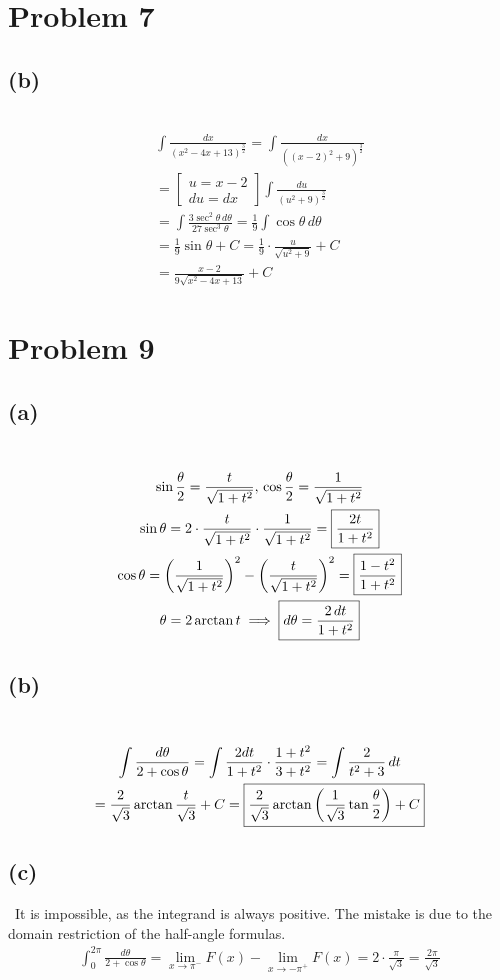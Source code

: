 \documentclass[12pt]{article}
\newcommand*{\paren}[1]{\ensuremath\left(#1\right)}
\newcommand{\problem}[1]{\section{Problem #1}}
\newcommand{\subproblem}[1]{\subsection{(#1)} \,}
\begin{document}
\problem{7}

\subproblem{b}
\begin{gather*}
    \int \frac{dx}{(x^2-4x+13)^\frac{3}{2}}
    = \int \frac{dx}{((x-2)^2+9)^\frac{3}{2}}\\
    =\begin{bmatrix}
        u=x-2\\
        du=dx
    \end{bmatrix}
    \int \frac{du}{(u^2+9)^\frac{3}{2}}\\
    = \int \frac{3\sec^2 \theta\, d\theta }{27\sec^3 \theta }
    = \frac{1}{9} \int \cos \theta \, d\theta \\
    =\frac{1}{9} \sin \theta + C = \frac{1}{9} \cdot \frac{u}{\sqrt{u^2+9}}+C\\
    =\boxed{ \frac{x-2}{9\sqrt{x^2-4x+13}} + C}
\end{gather*}

\problem{9}

\subproblem{a}
\begin{gather*}
    \sin \frac{\theta}{2}=\frac{t}{\sqrt{1+t^2}},\, \cos \frac{\theta}{2}= \frac{1}{\sqrt{1+t^2}}\\
    \sin \theta = 2 \cdot \frac{t}{\sqrt{1+t^2}} \cdot \frac{1}{\sqrt{1+t^2}} = \boxed{\frac{2t}{1+t^2}}\\
    \cos \theta = \paren{\frac{1}{\sqrt{1+t^2}}}^2 - \paren{\frac{t}{\sqrt{1+t^2}}}^2 = \boxed{\frac{1-t^2}{1+t^2}}\\
    \theta = 2 \arctan t \implies \boxed{d \theta = \frac{2\, dt}{1+t^2}}
\end{gather*}

\subproblem{b}
\begin{gather*}
    \int \frac{d\theta}{2+\cos \theta } 
    = \int \frac{2dt}{1+t^2}\cdot \frac{1+t^2}{3+t^2} = \int \frac{2}{t^2+3}\, dt\\
    = \frac{2}{\sqrt{3}} \arctan  \frac{t}{\sqrt{3}} + C =  \boxed{\frac{2}{\sqrt{3}} \arctan \paren{\frac{1}{\sqrt{3}} \tan \frac{\theta}{2}}  + C}
\end{gather*}

\subproblem{c}
It is impossible, as the integrand is always positive. The mistake is due to the domain restriction of the half-angle formulas. 
\begin{gather*}
    \int_0^{2\pi} \frac{d\theta}{2+\cos \theta } = \lim_{x \to \pi^-} F(x) - \lim_{x\to -\pi^+} F(x) = 2\cdot \frac{\pi}{\sqrt{3}} = \boxed{\frac{2\pi}{\sqrt{3}}}
\end{gather*}
\end{document}
